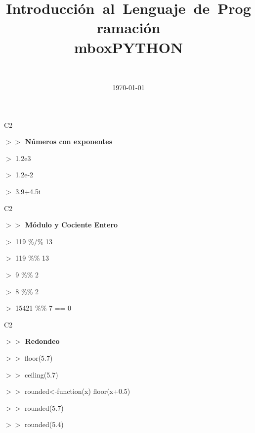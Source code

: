 \documentclass{beamer}
\title[Introducci\'on]
{\mbox{Introducci\'on al Lenguaje de Programaci\'on}\\mbox{PYTHON}}
\author[santosg572@gmail.com]{\nombre \
{\small \correo}}
\institute[\iniciales]{\instituto}
\date{\today}
\theoremstyle{definition}
\theoremstyle{remark}
\begin{document}






\begin{frame}{C2}

\textbf{$>>$ N\'umeros con exponentes}

\hfill

$>$ 1.2e3

\hfill

$>$ 1.2e-2

\hfill

$>$ 3.9+4.5i 

\hfill
\end{frame}

\begin{frame}{C2}

\textbf{$>>$ M\'odulo y Cociente Entero}

\hfill

$>$ 119 \%/\% 13

\hfill

$>$ 119 \%\% 13

\hfill

$>$ 9 \%\% 2

\hfill

$>$ 8 \%\% 2

\hfill

$>$ 15421 \%\% 7 == 0

   
\end{frame}

\begin{frame}{C2}

\textbf{$>>$ Redondeo}

\hfill

$>>$ floor(5.7)

\hfill

$>>$ ceiling(5.7)

\hfill

$>>$ rounded<-function(x) floor(x+0.5)

\hfill

$>>$ rounded(5.7)

\hfill

$>>$ rounded(5.4)

\end{frame}
\end{document}
